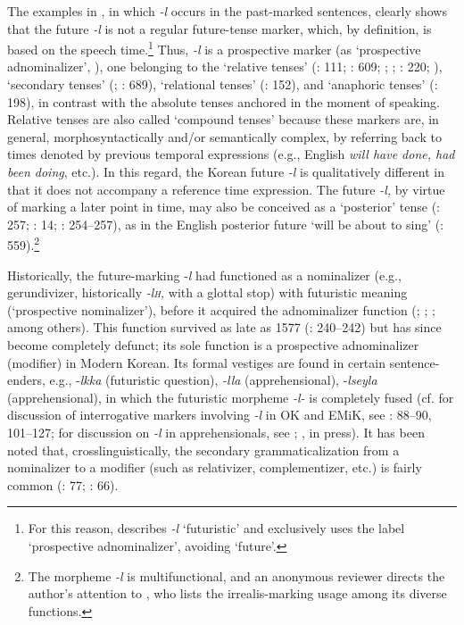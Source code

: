 \documentclass[output=paper,colorlinks,citecolor=brown]{langscibook}
\begin{document}
The examples in , in which \textit{-l} occurs in the past-marked sentences, clearly shows that the future \textit{-l} is not a regular future-tense marker, which, by definition, is based on the speech time.\footnote{For this reason, \citet{Rhee2008} describes \textit{-l} ‘futuristic’ and exclusively uses the label ‘prospective adnominalizer’, avoiding ‘future’.} Thus, \textit{-l} is a prospective marker (as ‘prospective adnominalizer’, \cite{Rhee2008}), one belonging to the ‘relative tenses’ (\cite{McCawley1971}: 111; \cite{Partee1973}: 609; \cite{Comrie1985}; \cite{Dahl1985}; \cite{Michaelis2006}: 220; \cite{Hengeveld2011}), ‘secondary tenses’ (\cite{Diewald2011}; \cite{Lyons1977}: 689), ‘relational tenses’ (\cite{HopperTraugott2003}: 152), and ‘anaphoric tenses’ (\cite{LoCascio1986}: 198), in contrast with the absolute tenses anchored in the moment of speaking. Relative tenses are also called ‘compound tenses’ because these markers are, in general, morphosyntactically and/or semantically complex, by referring back to times denoted by previous temporal expressions (e.g., English \textit{will have done, had been doing}, etc.). In this regard, the Korean future \textit{-l} is qualitatively different in that it does not accompany a reference time expression. The future \textit{-l,} by virtue of marking a later point in time, may also be conceived as a ‘posterior’ tense (\cite{Jespersen1924}: 257; \cite{Bull1963}: 14; \cite{KampRohrer1983}: 254--257), as in the English posterior future ‘will be about to sing’ (\cite{Binnick2001}: 559).\footnote{The morpheme \textit{-l} is multifunctional, and an anonymous reviewer directs the author’s attention to \citet{Lim2009}, who lists the irrealis-marking usage among its diverse functions.}

Historically, the future-marking -\textit{l} had functioned as a nominalizer (e.g., gerundivizer, historically \textit{-l\textsc{h}, }with a glottal stop) with futuristic meaning (‘prospective nominalizer’), before it acquired the adnominalizer function (\cite{Kim1957}; \cite{lee1972koreanlinguistics}; \cite{Lee1997}; among others). This function survived as late as 1577 (\cite{Rhee2008}: 240--242) but has since become completely defunct; its sole function is a prospective adnominalizer (modifier) in Modern Korean. Its formal vestiges are found in certain sentence-enders, e.g., -\textit{lkka} (futuristic question), \textit{-lla} (apprehensional), -\textit{lseyla} (apprehensional), in which the futuristic morpheme \textit{-l-} is completely fused (cf. for discussion of interrogative markers involving \textit{-l} in OK and EMiK, see \cite{Ko2011}: 88--90, 101--127; for discussion on \textit{-l} in apprehensionals, see \cite{Yae2023}; \citeauthor{RheeKuteva2023}, in press). It has been noted that, crosslinguistically, the secondary grammaticalization from a nominalizer to a modifier (such as relativizer, complementizer, etc.) is fairly common (\cite{Yap2010}: 77; \cite{Yap2011}: 66). 
\end{document}
